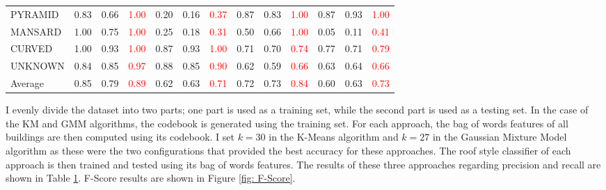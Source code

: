 \documentclass{iitthesis}
\begin{document}
\begin{table}[t]
{\begin{tabular}{ccccccccccccc}
\multicolumn{1}{l}{{PYRAMID}} & 
\multicolumn{1}{c}{0.83} & 0.66 & \textcolor{red}{1.00} & 
0.20 & 0.16 & \textcolor{red}{0.37} & 
0.87 & 0.83 & \textcolor{red}{1.00} & 
0.87 & 0.93 & \textcolor{red}{1.00}\\


\multicolumn{1}{l}{{MANSARD}} & 
\multicolumn{1}{c}{1.00} & 0.75 & \textcolor{red}{1.00} & 
0.25 & 0.18 & \textcolor{red}{0.31} & 
0.50 & 0.66 & \textcolor{red}{1.00} & 
0.05 & 0.11 & \textcolor{red}{0.41}\\


\multicolumn{1}{l}{{CURVED}} & 
\multicolumn{1}{c}{1.00} & 0.93 & \textcolor{red}{1.00} & 
0.87 & 0.93 & \textcolor{red}{1.00} & 
0.71 & 0.70 & \textcolor{red}{0.74} & 
0.77 & 0.71 & \textcolor{red}{0.79}\\


\multicolumn{1}{l}{{UNKNOWN}} & 
\multicolumn{1}{c}{0.84} & 0.85 & \textcolor{red}{0.97} & 
0.88 & 0.85 & \textcolor{red}{0.90} & 
0.62 & 0.59 & \textcolor{red}{0.66} & 
0.63 & 0.64 & \textcolor{red}{0.66}\\


\multicolumn{1}{l}{{Average}} & 
\multicolumn{1}{c}{0.85} & 0.79 & \textcolor{red}{0.89} & 
0.62 & 0.63 & \textcolor{red}{0.71} & 
0.72 & 0.73 & \textcolor{red}{0.84} & 
0.60 & 0.63 & \textcolor{red}{0.73}\\
\hline

\end{tabular}
}
\label{table: pr}
\end{table}

I evenly divide the dataset into two parts; one part is used as a training set, while the second part is used as a testing set. In the case of the KM and GMM algorithms, the codebook is generated using the training set. For each approach, the bag of words features of all buildings are then computed using its codebook. I set $k=30$ in the K-Means algorithm and $k=27$ in the Gaussian Mixture Model algorithm as these were the two configurations that provided the best accuracy for these approaches. The roof style classifier of each approach is then trained and tested using its bag of words features. The results of these three approaches regarding precision and recall are shown in Table \ref{table: pr}. F-Score results are shown in Figure \ref{fig: F-Score}. 
\end{document}
